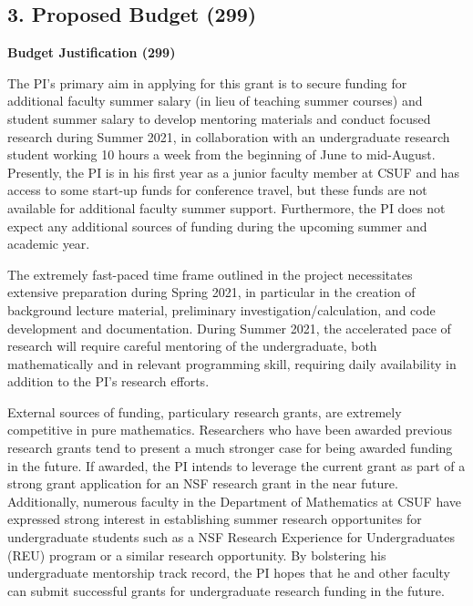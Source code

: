 \documentclass[12pt,letterpaper]{article}
\theoremstyle{definition}
\begin{document}
\subsection*{\hfil 3. Proposed Budget (299)\hfil}

\noindent\textbf{Budget Justification (299)}

The PI's primary aim in applying for this grant is to secure funding for additional faculty summer salary (in lieu of teaching summer courses) and student summer salary to develop mentoring materials and conduct focused research during Summer 2021, in collaboration with an undergraduate research student working 10 hours a week from the beginning of June to mid-August.
Presently, the PI is in his first year as a junior faculty member at CSUF and has access to some start-up funds for conference travel, but these funds are not available for additional faculty summer support.  Furthermore, the PI does not expect any additional sources of funding during the upcoming summer and academic year.

The extremely fast-paced time frame outlined in the project necessitates extensive preparation during Spring 2021, in particular in the creation of background lecture material, preliminary investigation/calculation, and code development and documentation.  During Summer 2021, the accelerated pace of research will require careful mentoring of the undergraduate, both mathematically and in relevant programming skill, requiring daily availability in addition to the PI's research efforts.

External sources of funding, particulary research grants, are extremely competitive in pure mathematics.  Researchers who have been awarded previous research grants tend to present a much stronger case for being awarded funding in the future.  If awarded, the PI intends to leverage the current grant as part of a strong grant application for an NSF research grant in the near future.  Additionally, numerous faculty in the Department of Mathematics at CSUF have expressed strong interest in establishing summer research opportunites for undergraduate students such as a NSF Research Experience for Undergraduates (REU) program or a similar research opportunity.  By bolstering his undergraduate mentorship track record, the PI hopes that he and other faculty can submit successful grants for undergraduate research funding in the future.
\end{document}
